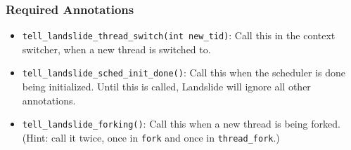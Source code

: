 \subsubsection{Required Annotations}


\begin{itemize}
	\small
	\item \texttt{tell\_landslide\_thread\_switch(int new\_tid)}: Call this in the context switcher, when a new thread is switched to.
	\item \texttt{tell\_landslide\_sched\_init\_done()}: Call this when the scheduler is done being initialized. Until this is called, Landslide will ignore all other annotations.
	\item \texttt{tell\_landslide\_forking()}: Call this when a new thread is being forked.
		(Hint: call it twice, once in \texttt{fork} and once in \texttt{thread\_fork}.)


\end{itemize}
